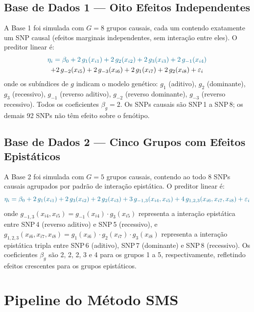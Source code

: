 \documentclass[
    12pt,
    a4paper,
    oneside,
    english,
    french,
    spanish,
    brazil
    ]{abntex2}
\newcommand{\novo}[1]{\textcolor{corNova}{#1}}
\begin{document}
\subsection*{Base de Dados 1 --- Oito Efeitos Independentes}

\novo{A Base 1 foi simulada com $G = 8$ grupos causais, cada um contendo exatamente um SNP causal (efeitos marginais independentes, sem interação entre eles). O preditor linear é:}
\begin{multline}
  \color{corNova}
  \eta_i = \beta_0 + 2\,g_1(x_{i1}) + 2\,g_2(x_{i2}) + 2\,g_3(x_{i3}) + 2\,g_{-1}(x_{i4}) \\
         + 2\,g_{-2}(x_{i5}) + 2\,g_{-3}(x_{i6}) + 2\,g_1(x_{i7}) + 2\,g_2(x_{i8}) + \varepsilon_i
  \label{eq:base1}
\end{multline}
\novo{onde os subíndices de $g$ indicam o modelo genético: $g_1$ (aditivo), $g_2$ (dominante), $g_3$ (recessivo), $g_{-1}$ (reverso aditivo), $g_{-2}$ (reverso dominante), $g_{-3}$ (reverso recessivo). Todos os coeficientes $\beta_g = 2$. Os SNPs causais são SNP\,1 a SNP\,8; os demais 92 SNPs não têm efeito sobre o fenótipo.}

\subsection*{Base de Dados 2 --- Cinco Grupos com Efeitos Epistáticos}

\novo{A Base 2 foi simulada com $G = 5$ grupos causais, contendo ao todo 8 SNPs causais agrupados por padrão de interação epistática. O preditor linear é:}
\begin{equation}
  \novo{\eta_i = \beta_0
         + 2\,g_1(x_{i1})
         + 2\,g_3(x_{i2})
         + 2\,g_2(x_{i3})
         + 3\,g_{-1,3}(x_{i4}, x_{i5})
         + 4\,g_{1,2,3}(x_{i6}, x_{i7}, x_{i8})
         + \varepsilon_i}
  \label{eq:base2}
\end{equation}
\novo{onde $g_{-1,3}(x_{i4}, x_{i5}) = g_{-1}(x_{i4}) \cdot g_3(x_{i5})$ representa a interação epistática entre SNP\,4 (reverso aditivo) e SNP\,5 (recessivo), e $g_{1,2,3}(x_{i6}, x_{i7}, x_{i8}) = g_1(x_{i6}) \cdot g_2(x_{i7}) \cdot g_3(x_{i8})$ representa a interação epistática tripla entre SNP\,6 (aditivo), SNP\,7 (dominante) e SNP\,8 (recessivo). Os coeficientes $\beta_g$ são 2, 2, 2, 3 e 4 para os grupos 1 a 5, respectivamente, refletindo efeitos crescentes para os grupos epistáticos.}

\section*{Pipeline do Método SMS}
\end{document}
